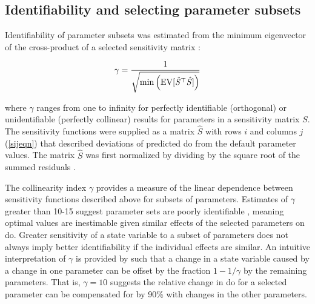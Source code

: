\documentclass[letterpaper,12pt,oneside]{article}\usepackage[]{graphicx}\usepackage[]{color}
\begin{document}
\subsection{Identifiability and selecting parameter subsets}

Identifiability of parameter subsets was estimated from the minimum eigenvector of the cross-product of a selected sensitivity matrix \citep{Brun01,Omlin01}:

\begin{equation} \label{gameq}
\gamma = \frac{1} {\sqrt{ \min \left(\rm{EV}[\mathit{\hat{S}}^\top \mathit{\hat{S}}]\right)}}
\end{equation}

\noindent where $\gamma$ ranges from one to infinity for perfectly identifiable (orthogonal) or unidentifiable (perfectly collinear) results for parameters in a sensitivity matrix $S$.  The sensitivity functions were supplied as a matrix $\hat{S}$ with rows $i$ and columns $j$ (\cref{sijeqn}) that described deviations of predicted \ac{do} from the default parameter values.  The matrix $\hat{S}$ was first normalized by dividing by the square root of the summed residuals \citep{Omlin01,Soetaert10}. 

The collinearity index $\gamma$ provides a measure of the linear dependence between sensitivity functions described above for subsets of parameters. Estimates of $\gamma$ greater than 10-15 suggest parameter sets are poorly identifiable \citep{Brun01,Omlin01}, meaning optimal values are inestimable given similar effects of the selected parameters on \ac{do}. Greater sensitivity of a state variable to a subset of parameters does not always imply better identifiability if the individual effects are similar.  An intuitive interpretation of $\gamma$ is provided by \citet{Brun01} such that a change in a state variable caused by a change in one parameter can be offset by the fraction $1 - 1/\gamma$ by the remaining parameters.  That is, $\gamma = 10$ suggests the relative change in \ac{do} for a selected parameter can be compensated for by 90\% with changes in the other parameters. 
\end{document}
